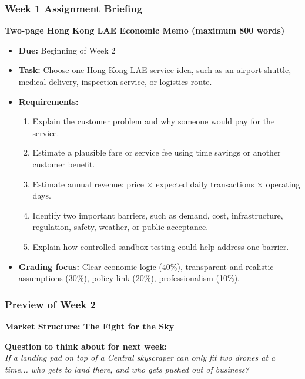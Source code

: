 \documentclass{beamer}
\begin{document}
\begin{frame}[t]
  \frametitle{Week 1 Assignment Briefing}
  \textbf{Two-page Hong Kong LAE Economic Memo (maximum 800 words)}
  \begin{itemize}
    \item \textbf{Due:} Beginning of Week 2
    \item \textbf{Task:} Choose one Hong Kong LAE service idea, such as an airport shuttle, medical delivery, inspection service, or logistics route.
    \item \textbf{Requirements:}
    \begin{enumerate}
      \item Explain the customer problem and why someone would pay for the service.
      \item Estimate a plausible fare or service fee using time savings or another customer benefit.
      \item Estimate annual revenue: price $\times$ expected daily transactions $\times$ operating days.
      \item Identify two important barriers, such as demand, cost, infrastructure, regulation, safety, weather, or public acceptance.
      \item Explain how controlled sandbox testing could help address one barrier.
    \end{enumerate}
    \item \textbf{Grading focus:} Clear economic logic (40\%), transparent and realistic assumptions (30\%), policy link (20\%), professionalism (10\%).
  \end{itemize}
\end{frame}

\begin{frame}[t]
  \frametitle{Preview of Week 2}
  
  \begin{center}
      \Large \textbf{Market Structure: The Fight for the Sky}
  \end{center}
  
  \vspace{1cm}
  \textbf{Question to think about for next week:} \\
  \textit{If a landing pad on top of a Central skyscraper can only fit two drones at a time... who gets to land there, and who gets pushed out of business?}
\end{frame}
\end{document}
